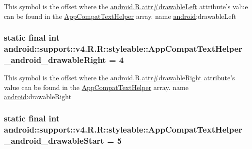 This symbol is the offset where the \hyperlink{}{android.R.attr\#drawableLeft} attribute's value can be found in the \hyperlink{classandroid_1_1support_1_1v4_1_1_r_1_1styleable_4b08e16e18a4842ae56614fdc42afc26}{AppCompatTextHelper} array.  name \hyperlink{namespaceandroid}{android}:drawableLeft \hypertarget{classandroid_1_1support_1_1v4_1_1_r_1_1styleable_9f63da404fcb525c4df8b777c6ae5ce5}{
\subsubsection[{AppCompatTextHelper\_\-android\_\-drawableRight}]{\setlength{\rightskip}{0pt plus 5cm}static final int android::support::v4.R.R::styleable::AppCompatTextHelper\_\-android\_\-drawableRight = 4}}
\label{classandroid_1_1support_1_1v4_1_1_r_1_1styleable_9f63da404fcb525c4df8b777c6ae5ce5}


This symbol is the offset where the \hyperlink{}{android.R.attr\#drawableRight} attribute's value can be found in the \hyperlink{classandroid_1_1support_1_1v4_1_1_r_1_1styleable_4b08e16e18a4842ae56614fdc42afc26}{AppCompatTextHelper} array.  name \hyperlink{namespaceandroid}{android}:drawableRight \hypertarget{classandroid_1_1support_1_1v4_1_1_r_1_1styleable_bd3630b47fe4b2f49803b58778a2decc}{
\subsubsection[{AppCompatTextHelper\_\-android\_\-drawableStart}]{\setlength{\rightskip}{0pt plus 5cm}static final int android::support::v4.R.R::styleable::AppCompatTextHelper\_\-android\_\-drawableStart = 5}}
\label{classandroid_1_1support_1_1v4_1_1_r_1_1styleable_bd3630b47fe4b2f49803b58778a2decc}


